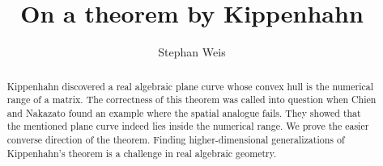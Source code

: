 \documentclass[12pt]{amsart}
\theoremstyle{definition}
\numberwithin{equation}{section}
\begin{document}
\title{On a theorem by Kippenhahn}
\author{Stephan Weis}
\begin{abstract}   
Kippenhahn discovered a real algebraic plane curve whose convex hull 
is the numerical range of a matrix. The correctness of this theorem 
was called into question when Chien and Nakazato found an example 
where the spatial analogue fails. They showed that the mentioned 
plane curve indeed lies inside the numerical range. We prove the 
easier converse direction of the theorem. Finding higher-dimensional 
generalizations of Kippenhahn's theorem is a challenge in real 
algebraic geometry.
\end{abstract}
\maketitle
\thispagestyle{empty}
\pagestyle{myheadings}
\end{document}

